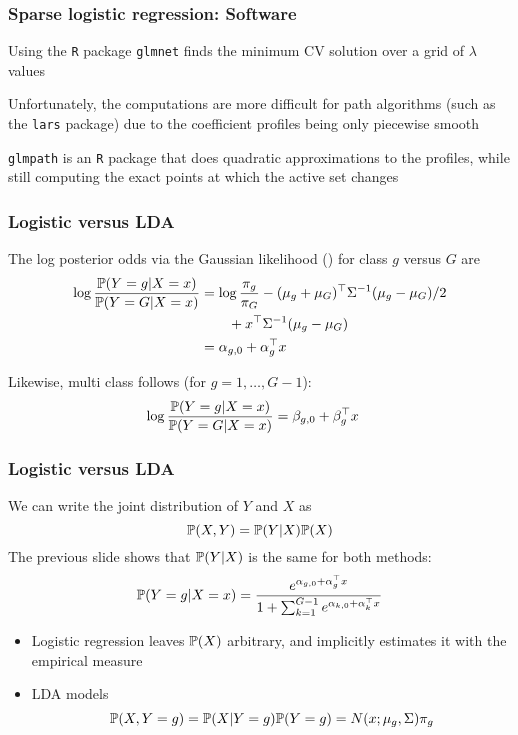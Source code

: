 \documentclass[12pt]{beamer}
\begin{document}
\begin{frame}
\frametitle{Sparse logistic regression: Software}
Using the {\tt R} package {\tt glmnet} finds the minimum CV solution over a grid of $\lambda$ values

\vsp
Unfortunately, the computations are more difficult for path algorithms (such as the {\tt lars} package)
due to the coefficient profiles being only piecewise smooth

\vsp
{\tt glmpath} is an {\tt R} package that does quadratic approximations to the profiles, while
still computing the exact points at which the active set changes 

\vsp
{}
\end{frame}

\begin{frame}
\frametitle{Logistic versus LDA}
The log posterior odds via the Gaussian likelihood () for class $g$ versus $G$ are
\begin{align*}
\log \frac{ \P(Y = g | X= x)}{\P(Y = G | X = x) } 
& =
\log \frac{\pi_g}{\pi_{G}} - (\mu_{g} + \mu_{G})^{\top} \Sigma^{-1} (\mu_g - \mu_{G})/2   \\
& \qquad +  x^{\top} \Sigma^{-1}(\mu_g - \mu_{G}) \\
& = \alpha_{g,0} + \alpha_g^{\top}x
\end{align*}

\vsp
Likewise, multi class  follows (for $g = 1,\ldots,G-1$):
\begin{align*}
\log \frac{ \P(Y = g | X= x)}{\P(Y = G | X = x) } 
& =
\beta_{g,0} + \beta_{g}^{\top}x
\end{align*}

\vsp
{}
\end{frame}

\begin{frame}
\frametitle{Logistic versus LDA}
We can write the joint distribution of $Y$ and $X$ as
\[
\P(X,Y) = \P(Y|X)\P(X)
\]
The previous slide shows that $\P(Y|X)$ is the same for both methods:
\[
\P(Y = g | X = x)
 = 
 \frac{e^{\alpha_{g,0} + \alpha_{g}^{\top}x}}{1 + \sum_{k = 1}^{G-1} e^{\alpha_{k,0} + \alpha_{k}^{\top}x}}
\]

\begin{itemize}
\item Logistic regression leaves $\P(X)$ arbitrary, and implicitly estimates it with the empirical measure 

\item LDA models 
\[
\P(X,Y=g) = \P(X | Y=g) \P(Y=g) = N(x;\mu_g,\Sigma) \pi_g
\]
\end{itemize}
\end{frame}
\end{document}
